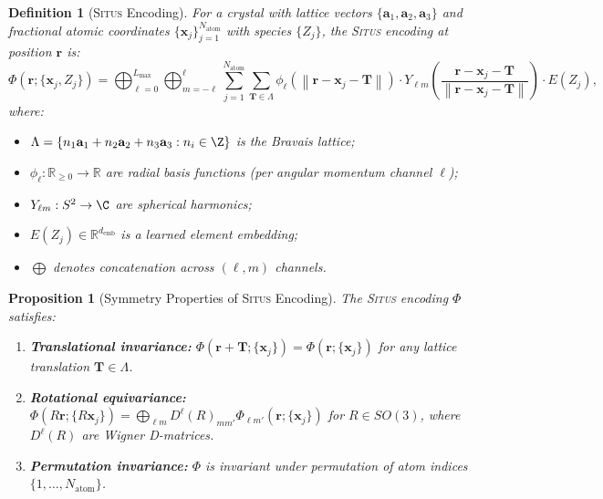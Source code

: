 \documentclass[11pt,a4paper]{article}
\newtheorem{proposition}[theorem]{Proposition}
\newtheorem{definition}[theorem]{Definition}
\theoremstyle{definition}
\newcommand{\Situs}{\textsc{Situs}}
\newcommand{\R}{\mathbb{R}}
\newcommand{\norm}[1]{\left\lVert#1\right\rVert}
\begin{document}
\begin{definition}[\Situs{} Encoding]\label{def:situs}
For a crystal with lattice vectors $\{\mathbf{a}_1, \mathbf{a}_2, \mathbf{a}_3\}$ and fractional atomic coordinates $\{\mathbf{x}_j\}_{j=1}^{N_{\mathrm{atom}}}$ with species $\{Z_j\}$, the \Situs{} encoding at position $\mathbf{r}$ is:
\begin{equation}\label{eq:situs_def}
\Phi(\mathbf{r}; \{\mathbf{x}_j, Z_j\}) = \bigoplus_{\ell=0}^{L_{\max}} \bigoplus_{m=-\ell}^{\ell} \sum_{j=1}^{N_{\mathrm{atom}}} \sum_{\mathbf{T} \in \Lambda} \phi_\ell(\norm{\mathbf{r} - \mathbf{x}_j - \mathbf{T}}) \cdot Y_{\ell m}\left(\frac{\mathbf{r} - \mathbf{x}_j - \mathbf{T}}{\norm{\mathbf{r} - \mathbf{x}_j - \mathbf{T}}}\right) \cdot E(Z_j),
\end{equation}
where:
\begin{itemize}
    \item $\Lambda = \{n_1\mathbf{a}_1 + n_2\mathbf{a}_2 + n_3\mathbf{a}_3 : n_i \in \Z\}$ is the Bravais lattice;
    \item $\phi_\ell: \R_{\geq 0} \to \R$ are radial basis functions (per angular momentum channel $\ell$);
    \item $Y_{\ell m}: S^2 \to \C$ are spherical harmonics;
    \item $E(Z_j) \in \R^{d_{\mathrm{emb}}}$ is a learned element embedding;
    \item $\bigoplus$ denotes concatenation across $(\ell, m)$ channels.
\end{itemize}
\end{definition}

\begin{proposition}[Symmetry Properties of \Situs{} Encoding]\label{prop:situs_symmetry}
The \Situs{} encoding $\Phi$ satisfies:
\begin{enumerate}[label=(\roman*)]
    \item \textbf{Translational invariance:} $\Phi(\mathbf{r} + \mathbf{T}; \{\mathbf{x}_j\}) = \Phi(\mathbf{r}; \{\mathbf{x}_j\})$ for any lattice translation $\mathbf{T} \in \Lambda$.
    \item \textbf{Rotational equivariance:} $\Phi(R\mathbf{r}; \{R\mathbf{x}_j\}) = \bigoplus_{\ell m} D^\ell(R)_{mm'} \Phi_{\ell m'}(\mathbf{r}; \{\mathbf{x}_j\})$ for $R \in SO(3)$, where $D^\ell(R)$ are Wigner D-matrices.
    \item \textbf{Permutation invariance:} $\Phi$ is invariant under permutation of atom indices $\{1, \ldots, N_{\mathrm{atom}}\}$.
\end{enumerate}
\end{proposition}
\end{document}
